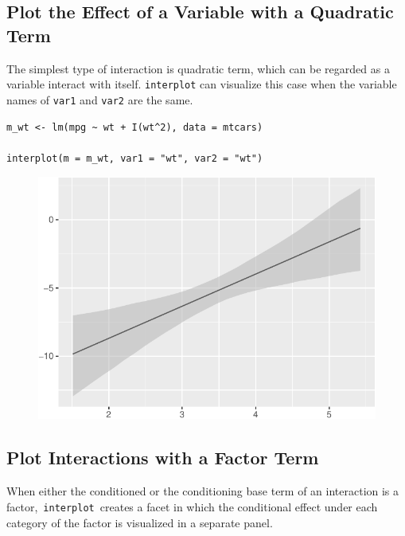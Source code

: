 \documentclass[
  article]{jss}
\begin{document}
\hypertarget{sec-plot-the-effect-of-a-variable-with-a-quadratic-term}{%
\subsection{Plot the Effect of a Variable with a Quadratic
Term}\label{sec-plot-the-effect-of-a-variable-with-a-quadratic-term}}

The simplest type of interaction is quadratic term, which can be
regarded as a variable interact with itself. \texttt{interplot} can
visualize this case when the variable names of \texttt{var1} and
\texttt{var2} are the same.

\begin{verbatim}
m_wt <- lm(mpg ~ wt + I(wt^2), data = mtcars)

interplot(m = m_wt, var1 = "wt", var2 = "wt")
\end{verbatim}

\begin{figure}[H]

{\centering \includegraphics{jss_manuscript_files/figure-pdf/unnamed-chunk-9-1.pdf}

}

\end{figure}

\hypertarget{plot-interactions-with-a-factor-term}{%
\subsection{Plot Interactions with a Factor
Term}\label{plot-interactions-with-a-factor-term}}

When either the conditioned or the conditioning base term of an
interaction is a factor,~\texttt{interplot}~creates a facet in which the
conditional effect under each category of the factor is visualized in a
separate panel.
\end{document}
